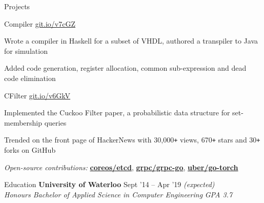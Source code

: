 \documentclass{resume} %
\begin{document}
\begin{rSection}{Projects}
  \begin{rSubsection}{Compiler}
                     {\href{https://git.io/v7cGZ}{git.io/v7cGZ}}
                     {}{}
   \item Wrote a compiler in Haskell for a subset of VHDL, authored a
     transpiler to Java for simulation
   \item Added code generation, register allocation, common sub-expression and
     dead code elimination
  \end{rSubsection}

  \begin{rSubsection}{CFilter}
    {\href{https://git.io/v6GkV}{git.io/v6GkV}}
                     {}{}
     \item Implemented the Cuckoo Filter paper, a probabilistic data structure for
       set-membership queries
     \item Trended on the front page of HackerNews with 30,000\texttt{+} views,
       670\texttt{+} stars and 30\texttt{+} forks on GitHub
  \end{rSubsection}

  \begin{rMinisection}
    \item {\em Open-source contributions:}
      \href{https://github.com/coreos/etcd/pull/8288}{\textbf{coreos/etcd}},
      \href{https://github.com/grpc/grpc-go/pull/1478}{\textbf{grpc/grpc-go}},
      \href{https://github.com/uber/go-torch/pull/62}{\textbf{uber/go-torch}}
  \end{rMinisection}
\end{rSection}


\begin{rSection}{Education}
  {\bf University of Waterloo} \hfill {Sept '14 -- Apr '19 \em (expected)} \\
  {\em Honours Bachelor of Applied Science in Computer Engineering} \hfill {\em GPA 3.7}
  \vspace{0.5em}
\end{rSection}
\end{document}

